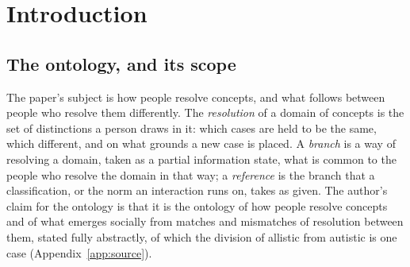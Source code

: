 \begin{abstract}
\end{abstract}

\section{Introduction}
\label{sec:intro}

\subsection{The ontology, and its scope}
\label{sec:scope}

The paper's subject is how people resolve concepts, and what follows between people who resolve them differently. The \emph{resolution} of a domain of concepts is the set of distinctions a person draws in it: which cases are held to be the same, which different, and on what grounds a new case is placed. A \emph{branch} is a way of resolving a domain, taken as a partial information state, what is common to the people who resolve the domain in that way; a \emph{reference} is the branch that a classification, or the norm an interaction runs on, takes as given. The author's claim for the ontology is that it is the ontology of how people resolve concepts and of what emerges socially from matches and mismatches of resolution between them, stated fully abstractly, of which the division of allistic from autistic is one case (Appendix~\ref{app:source}).

